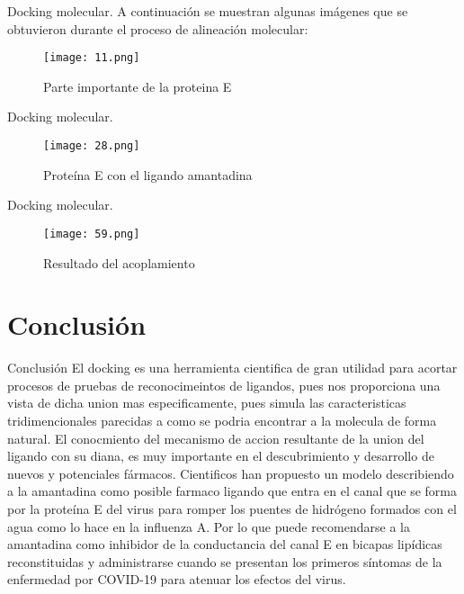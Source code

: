 \documentclass[11pt]{beamer}
\begin{document}
	
		
		\begin{frame}{Docking molecular.}
			\justifying
			A continuación se muestran algunas imágenes que se obtuvieron durante el proceso de alineación molecular:
			\begin{figure}[H]
				\centering
				\texttt{[image: 11.png]}
				\caption{Parte importante de la proteina E}
				\label{fig: Figura1}
			\end{figure}
		\end{frame} 
		
			\begin{frame}{Docking molecular.}
			\justifying
			\begin{figure}[H]
				\centering
				\texttt{[image: 28.png]}
				\caption{Proteína E con el ligando amantadina}
				\label{fig: Figura2}
			\end{figure}
		\end{frame} 
		
		\begin{frame}{Docking molecular.}
			\justifying
			\begin{figure}[H]
				\centering
				\texttt{[image: 59.png]}
				\caption{Resultado del acoplamiento}
				\label{fig: Figura3}
			\end{figure}
		\end{frame} 
		
	
	
	\section{Conclusión}
		\begin{frame}{Conclusión}
			\justifying El docking es una herramienta cientifica de gran utilidad para acortar procesos de pruebas de reconocimeintos de ligandos, pues nos proporciona una vista de dicha union mas especificamente, pues simula las caracteristicas tridimencionales parecidas a como  se podria encontrar a la molecula de forma natural. El conocmiento del mecanismo de accion resultante de la union del ligando con su diana, es muy importante en el descubrimiento y desarrollo de nuevos y potenciales fármacos. Cientificos  han propuesto un modelo describiendo a la amantadina como posible farmaco ligando que entra en el canal que se forma por la proteína E del virus para romper los puentes de hidrógeno formados con el agua como lo hace en la influenza A. Por lo que puede recomendarse a la amantadina como inhibidor de la conductancia del canal E en bicapas lipídicas reconstituidas y administrarse cuando se presentan los primeros síntomas de la enfermedad por COVID-19 para atenuar los efectos del virus. 
			
		\end{frame}
	
\end{document}
